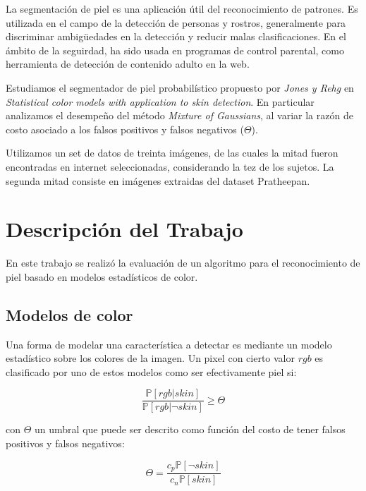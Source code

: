 \documentclass[12pt]{article}
\begin{document}
La segmentación de piel es una aplicación útil del reconocimiento de patrones. Es utilizada en el campo de la detección de personas y rostros, generalmente
para discriminar ambigüedades en la detección y reducir malas clasificaciones. En el ámbito de la seguirdad, ha sido usada en programas de control parental, como herramienta de detección de contenido adulto en la web.

Estudiamos el segmentador de piel probabilístico propuesto por \emph{Jones y Rehg} en \emph{Statistical color models with application to skin detection}. En particular analizamos el desempeño del método \emph{Mixture of Gaussians}, al variar la razón de costo asociado a los falsos positivos y falsos negativos ($\Theta$).

Utilizamos un set de datos de treinta imágenes, de las cuales la mitad fueron encontradas en internet seleccionadas, considerando la tez de los sujetos. La segunda mitad consiste en imágenes extraidas del dataset Pratheepan.



\section{Descripción del Trabajo}

En este trabajo se realizó la evaluación de un algoritmo para el reconocimiento
de piel basado en modelos estadísticos de color. 

\subsection{Modelos de color}

Una forma de modelar una característica a detectar es mediante un modelo
estadístico sobre los colores de la imagen. Un pixel con cierto valor $rgb$ es
clasificado por uno de estos modelos como ser efectivamente piel si:

\begin{equation}
    \frac{ \mathbb{P} [ rgb|skin ] }{ \mathbb{P} [ rgb | \neg skin ] } \geq
    \Theta
\end{equation}

con $\Theta$ un umbral que puede ser descrito como función del costo de tener
falsos positivos y falsos negativos:

\begin{equation}
    \Theta = \frac{c_p \mathbb{P} [\neg skin]}{c_n \mathbb{P}[skin]}
\end{equation}
\end{document}
